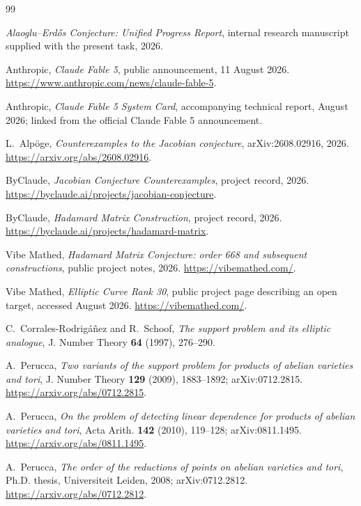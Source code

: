 \documentclass[11pt]{article}
\theoremstyle{definition}
\theoremstyle{remark}
\begin{document}
\begin{thebibliography}{99}

\emph{Alaoglu--Erd\H{o}s Conjecture: Unified Progress Report},
internal research manuscript supplied with the present task, 2026.

Anthropic,
\emph{Claude Fable 5}, public announcement, 11 August 2026.
\url{https://www.anthropic.com/news/claude-fable-5}.

Anthropic,
\emph{Claude Fable 5 System Card}, accompanying technical report, August 2026;
linked from the official Claude Fable 5 announcement.

L.~Alp\"oge,
\emph{Counterexamples to the Jacobian conjecture},
arXiv:2608.02916, 2026.
\url{https://arxiv.org/abs/2608.02916}.

ByClaude,
\emph{Jacobian Conjecture Counterexamples}, project record, 2026.
\url{https://byclaude.ai/projects/jacobian-conjecture}.

ByClaude,
\emph{Hadamard Matrix Construction}, project record, 2026.
\url{https://byclaude.ai/projects/hadamard-matrix}.

Vibe Mathed,
\emph{Hadamard Matrix Conjecture: order 668 and subsequent constructions},
public project notes, 2026.
\url{https://vibemathed.com/}.

Vibe Mathed,
\emph{Elliptic Curve Rank 30}, public project page describing an open target, accessed August 2026.
\url{https://vibemathed.com/}.

C.~Corrales-Rodrig\'a\~nez and R.~Schoof,
\emph{The support problem and its elliptic analogue},
J. Number Theory \textbf{64} (1997), 276--290.

A.~Perucca,
\emph{Two variants of the support problem for products of abelian varieties and tori},
J. Number Theory \textbf{129} (2009), 1883--1892;
arXiv:0712.2815.
\url{https://arxiv.org/abs/0712.2815}.

A.~Perucca,
\emph{On the problem of detecting linear dependence for products of abelian varieties and tori},
Acta Arith. \textbf{142} (2010), 119--128;
arXiv:0811.1495.
\url{https://arxiv.org/abs/0811.1495}.

A.~Perucca,
\emph{The order of the reductions of points on abelian varieties and tori},
Ph.D. thesis, Universiteit Leiden, 2008;
arXiv:0712.2812.
\url{https://arxiv.org/abs/0712.2812}.


\end{thebibliography}
\end{document}
